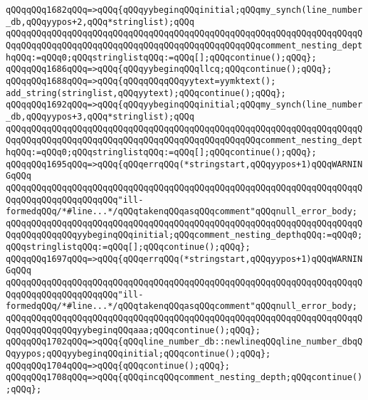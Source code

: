 \verb|qQQqqQQq1682qQQq=>qQQq{qQQqyybeginqQQqinitial;qQQqmy_synch(line_number_db,qQQqyypos+2,qQQq*stringlist);qQQq|\newline
\verb|qQQqqQQqqQQqqQQqqQQqqQQqqQQqqQQqqQQqqQQqqQQqqQQqqQQqqQQqqQQqqQQqqQQqqQQqqQQqqQQqqQQqqQQqqQQqqQQqqQQqqQQqqQQqqQQqqQQqqQQqcomment_nesting_depthqQQq:=qQQq0;qQQqstringlistqQQq:=qQQq[];qQQqcontinue();qQQq};|\newline
\verb|qQQqqQQq1686qQQq=>qQQq{qQQqyybeginqQQqllcq;qQQqcontinue();qQQq};|\newline
\verb|qQQqqQQq1688qQQq=>qQQq{qQQqqQQqqQQqyytext=yymktext();|\newline
\verb|add_string(stringlist,qQQqyytext);qQQqcontinue();qQQq};|\newline
\verb|qQQqqQQq1692qQQq=>qQQq{qQQqyybeginqQQqinitial;qQQqmy_synch(line_number_db,qQQqyypos+3,qQQq*stringlist);qQQq|\newline
\verb|qQQqqQQqqQQqqQQqqQQqqQQqqQQqqQQqqQQqqQQqqQQqqQQqqQQqqQQqqQQqqQQqqQQqqQQqqQQqqQQqqQQqqQQqqQQqqQQqqQQqqQQqqQQqqQQqqQQqqQQqcomment_nesting_depthqQQq:=qQQq0;qQQqstringlistqQQq:=qQQq[];qQQqcontinue();qQQq};|\newline
\verb|qQQqqQQq1695qQQq=>qQQq{qQQqerrqQQq(*stringstart,qQQqyypos+1)qQQqWARNINGqQQq|\newline
\verb|qQQqqQQqqQQqqQQqqQQqqQQqqQQqqQQqqQQqqQQqqQQqqQQqqQQqqQQqqQQqqQQqqQQqqQQqqQQqqQQqqQQqqQQqqQQq"ill-formedqQQq/*#line...*/qQQqtakenqQQqasqQQqcomment"qQQqnull_error_body;|\newline
\verb|qQQqqQQqqQQqqQQqqQQqqQQqqQQqqQQqqQQqqQQqqQQqqQQqqQQqqQQqqQQqqQQqqQQqqQQqqQQqqQQqqQQqyybeginqQQqinitial;qQQqcomment_nesting_depthqQQq:=qQQq0;qQQqstringlistqQQq:=qQQq[];qQQqcontinue();qQQq};|\newline
\verb|qQQqqQQq1697qQQq=>qQQq{qQQqerrqQQq(*stringstart,qQQqyypos+1)qQQqWARNINGqQQq|\newline
\verb|qQQqqQQqqQQqqQQqqQQqqQQqqQQqqQQqqQQqqQQqqQQqqQQqqQQqqQQqqQQqqQQqqQQqqQQqqQQqqQQqqQQqqQQqqQQq"ill-formedqQQq/*#line...*/qQQqtakenqQQqasqQQqcomment"qQQqnull_error_body;|\newline
\verb|qQQqqQQqqQQqqQQqqQQqqQQqqQQqqQQqqQQqqQQqqQQqqQQqqQQqqQQqqQQqqQQqqQQqqQQqqQQqqQQqqQQqyybeginqQQqaaa;qQQqcontinue();qQQq};|\newline
\verb|qQQqqQQq1702qQQq=>qQQq{qQQqline_number_db::newlineqQQqline_number_dbqQQqyypos;qQQqyybeginqQQqinitial;qQQqcontinue();qQQq};|\newline
\verb|qQQqqQQq1704qQQq=>qQQq{qQQqcontinue();qQQq};|\newline
\verb|qQQqqQQq1708qQQq=>qQQq{qQQqincqQQqcomment_nesting_depth;qQQqcontinue();qQQq};|\newline

